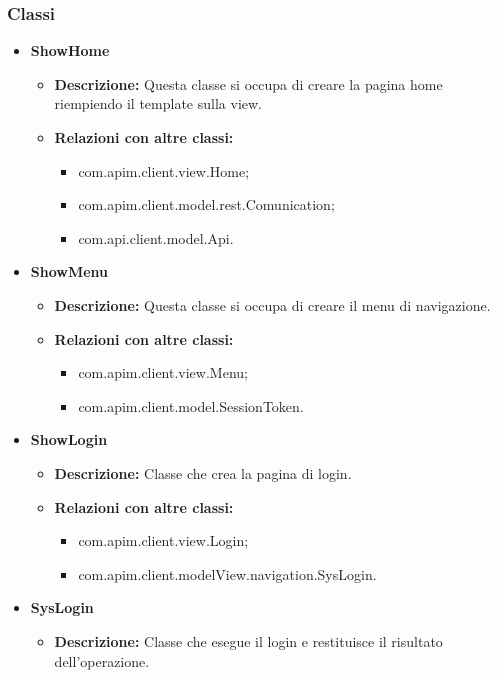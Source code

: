 {{		\subsubsection{Classi}{
			\begin{itemize}
				\item \textbf{ShowHome}
					\begin{itemize}
						\item \textbf{Descrizione:} Questa classe si occupa di creare la pagina home riempiendo il template sulla view.
						\item \textbf{Relazioni con altre classi:}
							\begin{itemize}
								\item com.apim.client.view.Home;
								\item com.apim.client.model.rest.Comunication;
								\item com.api.client.model.Api.
							\end{itemize}
					\end{itemize}
				\item \textbf{ShowMenu}
					\begin{itemize}
						\item \textbf{Descrizione:} Questa classe si occupa di creare il menu di navigazione.
						\item \textbf{Relazioni con altre classi:}
							\begin{itemize}
								\item com.apim.client.view.Menu;
								\item com.apim.client.model.SessionToken.
							\end{itemize}
					\end{itemize}
				\item \textbf{ShowLogin}
					\begin{itemize}
						\item \textbf{Descrizione:} Classe che crea la pagina di login.
						\item \textbf{Relazioni con altre classi:}
							\begin{itemize}
								\item com.apim.client.view.Login;
								\item com.apim.client.modelView.navigation.SysLogin.
							\end{itemize}
					\end{itemize}
				\item \textbf{SysLogin}
					\begin{itemize}
						\item \textbf{Descrizione:} Classe che esegue il login e restituisce il risultato dell'operazione.

\end{itemize}
\end{itemize}}}}

